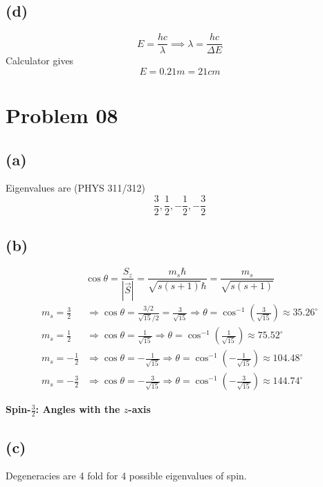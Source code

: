 \documentclass[a4paper]{article}
\begin{document}
\subsection*{(d)} 
\[
E = \frac{hc}{\lambda} \implies \lambda = \frac{hc}{\Delta E}
\]
Calculator gives 
\[
E = 0.21 m = \boxed{
21 cm
}
\] 




\section*{Problem 08} 
\subsection*{(a)} 
Eigenvalues are (PHYS 311/312)
\[
\frac{3}{2}, \frac{1}{2}, - \frac{1}{2}, - \frac{3}{2}
\] 

\subsection*{(b)} 
\[
\cos\theta = \frac{S_z}{|\vec{S}|} = \frac{m_s \hbar}{\sqrt{s(s+1)}\hbar} = \frac{m_s}{\sqrt{s(s+1)}}
\]
\begin{align*}
m_s = \frac{3}{2} &\Rightarrow \cos\theta = \frac{3/2}{\sqrt{15}/2} = \frac{3}{\sqrt{15}} \Rightarrow \theta = \cos^{-1}\left( \frac{3}{\sqrt{15}} \right) \approx 35.26^\circ \\
m_s = \frac{1}{2} &\Rightarrow \cos\theta = \frac{1}{\sqrt{15}} \Rightarrow \theta = \cos^{-1}\left( \frac{1}{\sqrt{15}} \right) \approx 75.52^\circ \\
m_s = -\frac{1}{2} &\Rightarrow \cos\theta = -\frac{1}{\sqrt{15}} \Rightarrow \theta = \cos^{-1}\left( -\frac{1}{\sqrt{15}} \right) \approx 104.48^\circ \\
m_s = -\frac{3}{2} &\Rightarrow \cos\theta = -\frac{3}{\sqrt{15}} \Rightarrow \theta = \cos^{-1}\left( -\frac{3}{\sqrt{15}} \right) \approx 144.74^\circ
\end{align*}

\begin{center}

\vspace{1em}
\textbf{Spin-\( \frac{3}{2} \): Angles with the \( z \)-axis}
\end{center}


\subsection*{(c)}
Degeneracies are 4 fold for 4 possible eigenvalues of spin.
\end{document}
